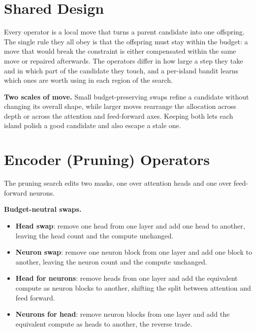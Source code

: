 \documentclass[10pt,twocolumn]{article}
\begin{document}
\appendix
{}

\section{Shared Design}
Every operator is a local move that turns a parent candidate into one offspring. The single rule they all obey is that the offspring must stay within the budget: a move that would break the constraint is either compensated within the same move or repaired afterwards. The operators differ in how large a step they take and in which part of the candidate they touch, and a per-island bandit learns which ones are worth using in each region of the search.

\begin{tcolorbox}[cvtbox]
\textbf{Two scales of move.} Small budget-preserving swaps refine a candidate without changing its overall shape, while larger moves rearrange the allocation across depth or across the attention and feed-forward axes. Keeping both lets each island polish a good candidate and also escape a stale one.
\end{tcolorbox}

\section{Encoder (Pruning) Operators}
The pruning search edits two masks, one over attention heads and one over feed-forward neurons.

\textbf{Budget-neutral swaps.}
\begin{itemize}[leftmargin=1.1em,itemsep=1pt,topsep=1pt]
\item \textbf{Head swap}: remove one head from one layer and add one head to another, leaving the head count and the compute unchanged.
\item \textbf{Neuron swap}: remove one neuron block from one layer and add one block to another, leaving the neuron count and the compute unchanged.
\item \textbf{Head for neurons}: remove heads from one layer and add the equivalent compute as neuron blocks to another, shifting the split between attention and feed forward.
\item \textbf{Neurons for head}: remove neuron blocks from one layer and add the equivalent compute as heads to another, the reverse trade.
\end{itemize}
\end{document}
